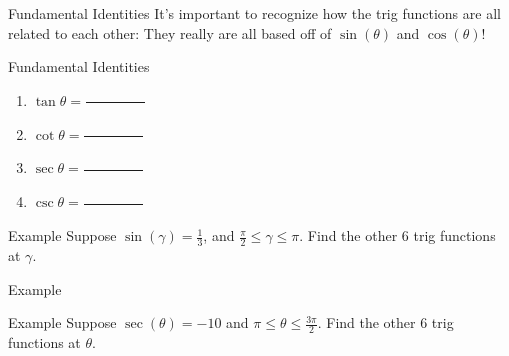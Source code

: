 \documentclass[presentation]{beamer}
\begin{document}
\begin{frame}[label={sec:orgac30275}]{Fundamental Identities}
It's important to recognize how the trig functions are all related to
each other: They really are all based off of \(\sin(\theta)\) and \(\cos(\theta)\)!

\begin{block}{Fundamental Identities}
\vspace*{0.2in}
\begin{enumerate}
\item \(\tan\theta = \frac{\hspace{1in}}{\hspace{1in}}\)\vspace*{0.2in}
\item \(\cot\theta = \frac{\hspace{1in}}{\hspace{1in}}\)\vspace*{0.2in}
\item \(\sec\theta = \frac{\hspace{1in}}{\hspace{1in}}\)\vspace*{0.2in}
\item \(\csc\theta = \frac{\hspace{1in}}{\hspace{1in}}\)\vspace*{0.2in}
\end{enumerate}
\end{block}
\end{frame}

\begin{frame}[label={sec:org1d3331b}]{Example}
Suppose \(\sin(\gamma) = \frac{1}{3}\), and \(\frac{\pi}{2} \le
\gamma \le \pi\).  Find the other 6 trig functions at \(\gamma\).
\vspace{10in}
\end{frame}

\begin{frame}[label={sec:orgf4f66b4}]{Example}
\end{frame}

\begin{frame}[label={sec:org28da791}]{Example}
Suppose \(\sec(\theta) = -10\) and \(\pi \le \theta \le
\frac{3\pi}{2}.\) Find the other 6 trig functions at \(\theta\).
\vspace{10in}
\end{frame}
\end{document}
